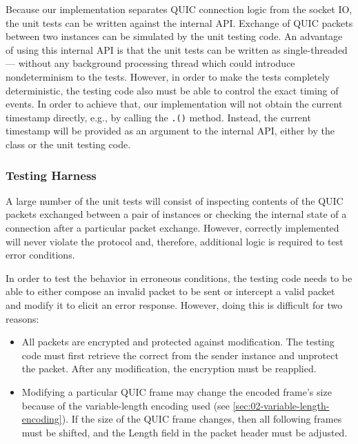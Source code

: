 Because our implementation separates QUIC connection logic from the socket IO, the unit tests can be
written against the internal \QuicConnection{} API\@. Exchange of QUIC packets between two
\QuicConnection{} instances can be simulated by the unit testing code. An advantage of using this
internal API is that the unit tests can be written as single-threaded --- without any background
processing thread which could introduce nondeterminism to the tests. However, in order to make the
tests completely deterministic, the testing code also must be able to control the exact timing of
events. In order to achieve that, our \QuicConnection{} implementation will not obtain the current
timestamp directly, e.g., by calling the \texttt{.()} method.
Instead, the current timestamp will be provided as an argument to the internal API, either by the
\QuicConnectionContext{} class or the unit testing code.

\subsubsection{Testing Harness}\label{sec:03-testing-harness}

A large number of the unit tests will consist of inspecting contents of the QUIC packets exchanged
between a pair of \QuicConnection{} instances or checking the internal state of a connection after a
particular packet exchange. However, correctly implemented \QuicConnection{} will never violate the
protocol and, therefore, additional logic is required to test error conditions.

In order to test the behavior in erroneous conditions, the testing code needs to be able to either
compose an invalid packet to be sent or intercept a valid packet and modify it to elicit an error
response. However, doing this is difficult for two reasons:

\begin{itemize}

  \item All packets are encrypted and protected against modification. The testing code must first
retrieve the correct \CryptoSeal{} from the sender \QuicConnection{} instance and unprotect the
packet. After any modification, the encryption must be reapplied.

  \item Modifying a particular QUIC frame may change the encoded frame's size because of the
variable-length encoding used (see \autoref{sec:02-variable-length-encoding}). If the size of the
QUIC frame changes, then all following frames must be shifted, and the Length field in the packet
header must be adjusted.

\end{itemize}

